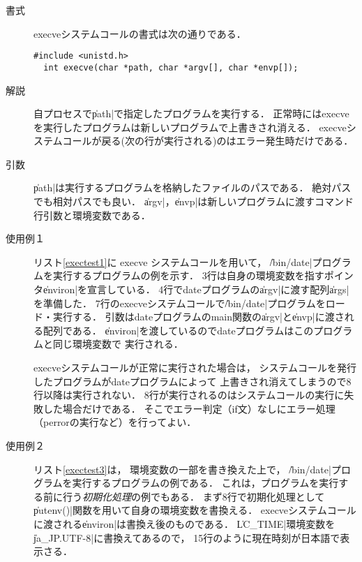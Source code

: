 \begin{description}
\item[書式] execveシステムコールの書式は次の通りである．
\begin{lstlisting}[numbers=none]
  #include <unistd.h>
  int execve(char *path, char *argv[], char *envp[]);
\end{lstlisting}

\item[解説]
  自プロセスで\|path|で指定したプログラムを実行する．
  正常時にはexecveを実行したプログラムは新しいプログラムで上書きされ消える．
  execveシステムコールが戻る(次の行が実行される)のはエラー発生時だけである．

\item[引数]
  \|path|は実行するプログラムを格納したファイルのパスである．
  絶対パスでも相対パスでも良い．
  \|argv|，\|envp|は新しいプログラムに渡すコマンド行引数と環境変数である．

\item[使用例１]
  リスト\ref{exectest1}に execve システムコールを用いて，
  \|/bin/date|プログラムを実行するプログラムの例を示す．
  3行は自身の環境変数を指すポインタ\|environ|を宣言している．
  4行でdateプログラムの\|argv|に渡す配列\|args|を準備した．
  7行のexecveシステムコールで\|/bin/date|プログラムをロード・実行する．
  引数はdateプログラムのmain関数の\|argv|と\|envp|に渡される配列である．
  \|environ|を渡しているのでdateプログラムはこのプログラムと同じ環境変数で
  実行される．

  execveシステムコールが正常に実行された場合は，
  システムコールを発行したプログラムがdateプログラムによって
  上書きされ消えてしまうので8行以降は実行されない．
  8行が実行されるのはシステムコールの実行に失敗した場合だけである．
  そこでエラー判定（if文）なしにエラー処理（perrorの実行など）を行ってよい．

  

\item[使用例２]
  リスト\ref{exectest3}は，
  環境変数の一部を書き換えた上で，
  \|/bin/date|プログラムを実行するプログラムの例である．
  これは，プログラムを実行する前に行う\emph{初期化処理}の例でもある．
  まず8行で初期化処理として\|putenv()|関数を用いて自身の環境変数を書換える．
  execveシステムコールに渡される\|environ|は書換え後のものである．
  \|LC_TIME|環境変数を\|ja_JP.UTF-8|に書換えてあるので，
  15行のように現在時刻が日本語で表示さる．

  


\end{description}
